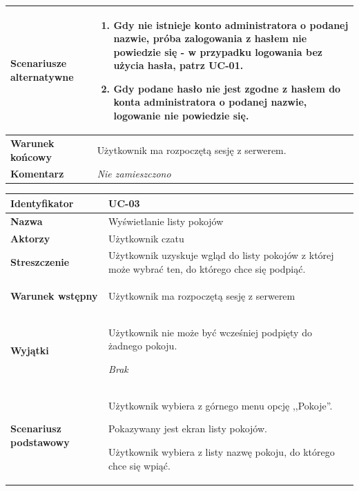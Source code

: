 {\begin{tabularx}{\textwidth}{|l|X|}
	\hline
		\textbf{Scenariusze alternatywne} &
			\begin{enumerate}
				\item Gdy nie istnieje konto administratora o podanej nazwie,
				próba zalogowania z hasłem nie powiedzie się - w przypadku logowania bez
				użycia hasła, patrz UC-01.
				\item Gdy podane hasło nie jest zgodne z hasłem do konta administratora
				o podanej nazwie, logowanie nie powiedzie	się.
			\end{enumerate}
		\\

	\hline
		\textbf{Warunek końcowy} &
			Użytkownik ma rozpoczętą sesję z serwerem.
		\\

	\hline
		\textbf{Komentarz} &
			\textit{Nie zamieszczono}
		\\

	\hline
\end{tabularx}

\vspace{2em}

\begin{tabularx}{\textwidth}{|l|X|}
	\hline
		\textbf{Identyfikator} &
		UC-03
		\\

	\hline
		\textbf{Nazwa} &
		Wyświetlanie listy pokojów
		\\

	\hline
		\textbf{Aktorzy} &
			Użytkownik czatu
		\\

	\hline
		\textbf{Streszczenie} &
			Użytkownik uzyskuje wgląd do listy pokojów z której może wybrać ten, do
			którego chce się podpiąć.
		\\

	\hline
		\textbf{Warunek wstępny} &
			\begin{enumreq}
				\item Użytkownik ma rozpoczętą sesję z serwerem
			\end{enumreq}
		\\

	\hline
		\textbf{Wyjątki} &
			\begin{enumreq}
				\item Użytkownik nie może być wcześniej podpięty do żadnego pokoju.
			\end{enumreq}
			\textit{Brak}
		\\

	\hline
		\textbf{Scenariusz podstawowy} &
			\begin{enumreq}
				\item Użytkownik wybiera z górnego menu opcję ,,Pokoje''.
				\item Pokazywany jest ekran listy pokojów.
				\item Użytkownik wybiera z listy nazwę pokoju, do którego chce
				się wpiąć.
			\end{enumreq}
		\\


\end{tabularx}}
